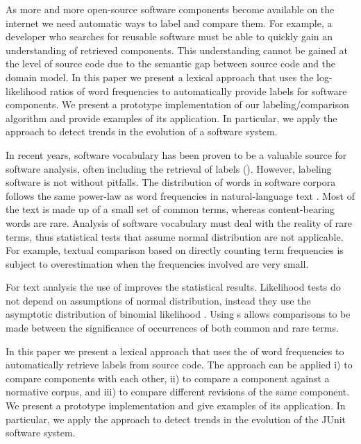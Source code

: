 \asteriskasteriskasterisk


As more and more open-source software components become available on the internet we need automatic ways to label and compare them. For example, a developer who searches for reusable software must be able to quickly gain an understanding of retrieved components. This understanding cannot be gained at the level of source code due to the semantic gap between source code and the domain model. In this paper we present a lexical approach that uses the log-likelihood ratios of word frequencies to automatically provide labels for software components. We present a prototype implementation of our labeling/comparison algorithm and provide examples of its application. In particular, we apply the approach to detect trends in the evolution of a software system.

In recent years, software vocabulary has been proven to be a valuable source for software analysis, often including the retrieval of labels (\eg \cite{Baldi08OOPSLA,EinarHoest,Kuhn07a}). However, labeling software is not without pitfalls. The distribution of words in software corpora follows the same power-law as word frequencies in natural-language text \cite{Linstead09SUITE}. Most of the text is made up of a small set of common terms, whereas content-bearing words are rare. Analysis of software vocabulary must deal with the reality of rare terms, thus statistical tests that assume normal distribution are not applicable. For example, textual comparison based on directly counting term frequencies is subject to overestimation when the frequencies involved are very small.  

For text analysis the use of \loglr improves the statistical results. Likelihood tests do not depend on assumptions of normal distribution, instead they use the asymptotic distribution of binomial likelihood \cite{Dunning}. Using \loglr{}s allows comparisons to be made between the significance of occurrences of both common and rare terms.

In this paper we present a lexical approach that uses the \loglr of word frequencies to automatically retrieve labels from source code. The approach can be applied i) to compare components with each other, ii) to compare a component against a normative corpus, and iii) to compare different revisions of the same component. We present a prototype implementation and give examples of its application. In particular, we apply the approach to detect trends in the evolution of the JUnit software system.

